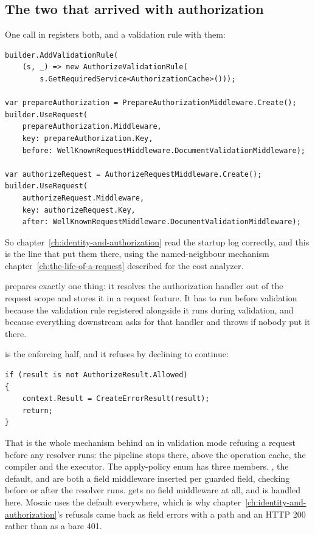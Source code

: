 \subsection*{The two that arrived with authorization}

%
One call in  registers both, and a
validation rule with them:

\begin{verbatim}
builder.AddValidationRule(
    (s, _) => new AuthorizeValidationRule(
        s.GetRequiredService<AuthorizationCache>()));

var prepareAuthorization = PrepareAuthorizationMiddleware.Create();
builder.UseRequest(
    prepareAuthorization.Middleware,
    key: prepareAuthorization.Key,
    before: WellKnownRequestMiddleware.DocumentValidationMiddleware);

var authorizeRequest = AuthorizeRequestMiddleware.Create();
builder.UseRequest(
    authorizeRequest.Middleware,
    key: authorizeRequest.Key,
    after: WellKnownRequestMiddleware.DocumentValidationMiddleware);
\end{verbatim}

So chapter~\ref{ch:identity-and-authorization} read the startup log correctly,
and this is the line that put them there, using the named-neighbour mechanism
chapter~\ref{ch:the-life-of-a-request} described for the cost analyzer.

 prepares exactly one thing: it resolves
the authorization handler out of the request scope and stores it in a request
feature. It has to run before validation because the validation rule registered
alongside it runs during validation, and because everything downstream asks for
that handler and throws if nobody put it there.

%
 is the enforcing half, and it refuses by
declining to continue:

\begin{verbatim}
if (result is not AuthorizeResult.Allowed)
{
    context.Result = CreateErrorResult(result);
    return;
}
\end{verbatim}

That  is the whole mechanism behind an \code{[Authorize]} in
validation mode refusing a request before any resolver runs: the pipeline stops
there, above the operation cache, the compiler and the executor. The apply-policy
enum has three members. , the
default, and  are both a field middleware inserted per
guarded field, checking before or after the resolver runs. 
gets no field middleware at all, and is handled here. Mosaic uses the default
everywhere, which is why chapter~\ref{ch:identity-and-authorization}'s refusals
came back as field errors with a path and an HTTP 200 rather than as a bare
401.

